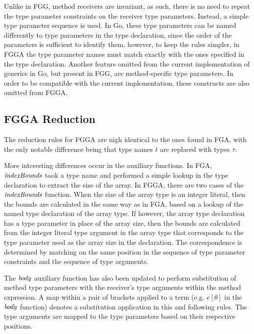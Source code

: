 Unlike in FGG, method receivers are invariant, as such, there is no need to
repeat the type parameter constraints on the receiver type parameters. Instead,
a simple type parameter sequence is used. In Go, these type parameters can be
named differently to type parameters in the type declaration, since the order of
the parameters is sufficient to identify them, however, to keep the rules
simpler, in FGGA the type parameter names must match exactly with the ones
specified in the type declaration. Another feature omitted from the current
implementation of generics in Go, but present in FGG, are method-specific type
parameters. In order to be compatible with the current implementation, these
constructs are also omitted from FGGA.



\subsection{FGGA Reduction}

The reduction rules for FGGA are nigh identical to the ones found in FGA, with
the only notable difference being that type names $t$ are replaced with types
$\tau$.

More interesting differences occur in the auxiliary functions. In FGA,
$\mathit{indexBounds}$ took a type name and performed a simple lookup in the type
declaration to extract the size of the array. In FGGA, there are two cases of
the $\mathit{indexBounds}$ function. When the size of the array type is an integer
literal, then the bounds are calculated in the same way as in FGA, based on a
lookup of the named type declaration of the array type. If however, the array
type declaration has a type parameter in place of the array size, then the
bounds are calculated from the integer literal type argument in the array type
that corresponds to the type parameter used as the array size in the
declaration. The correspondence is determined by matching on the same position
in the sequence of type parameter constraints and the sequence of type
arguments.

The $\mathit{body}$ auxiliary function has also been updated to perform substitution of
method type parameters with the receiver's type arguments within the method
expression. A map within a pair of brackets applied to a term (e.g. $e[\theta]$
in the $\mathit{body}$ function) denotes a substitution application in this and
following rules. The type arguments are mapped to the type parameters based on
their respective positions.

